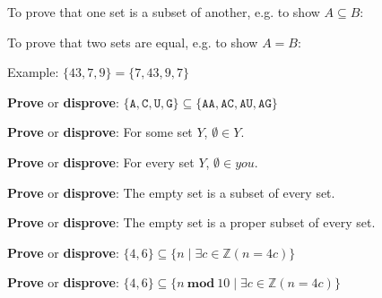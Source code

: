 \documentclass[12pt, oneside]{article}
\newcommand{\A}[0]{\texttt{A}}
\newcommand{\C}[0]{\texttt{C}}
\newcommand{\G}[0]{\texttt{G}}
\newcommand{\U}[0]{\texttt{U}}
\begin{document}
To prove that one set is a subset of another, e.g. to show $A \subseteq B$:

\vspace{50pt}

To prove that two sets are equal, e.g. to show $A = B$:

\vspace{50pt}
 \newpage


Example: $\{ 43, 7, 9 \} = \{ 7, 43, 9, 7\}$

\vspace{50pt}
 

{\bf Prove} or {\bf  disprove}: $\{ \A,  \C,  \U,  \G\} \subseteq \{ \A\A, \A\C, \A\U, \A\G \}$ 

\vspace{150pt}

{\bf Prove} or {\bf  disprove}: For some set $Y$, $\emptyset \in Y$.

\vspace{150pt}

{\bf Prove} or {\bf  disprove}: For every set $Y$, $\emptyset \in you$.

\vspace{150pt}

{\bf Prove} or {\bf  disprove}: The empty set is a subset of every set.

\vspace{150pt}

{\bf Prove} or {\bf  disprove}: The empty set is a proper subset of every set.

\vspace{150pt}

{\bf Prove} or {\bf  disprove}: $\{ 4, 6 \} \subseteq \{ n \mid  \exists c \in \mathbb{Z} ( n = 4c) \} $

\vspace{150pt}

{\bf Prove} or {\bf  disprove}: $\{ 4, 6 \} \subseteq \{ n ~\textbf{mod}~10 \mid  \exists c \in \mathbb{Z} ( n = 4c) \} $

\vspace{150pt}

 \vfill


 \vfill
\newpage
\end{document}
